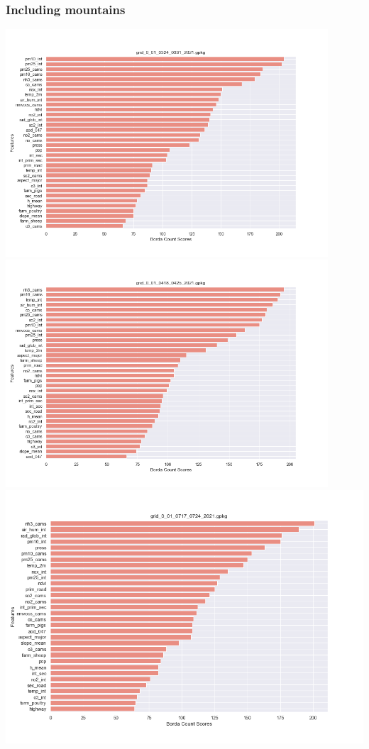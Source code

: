 \subsubsection{Including mountains}
\begin{center}
\includegraphics[width=0.9\textwidth]{images/fs_results/nh3/001/montains/grid_0_01_0324_0331_2021.png}
\includegraphics[width=0.9\textwidth]{images/fs_results/nh3/001/montains/grid_0_01_0418_0425_2021.png}
\includegraphics[width=.9\textwidth]{images/fs_results/nh3/001/montains/grid_0_01_0717_0724_2021.png}

\end{center}
